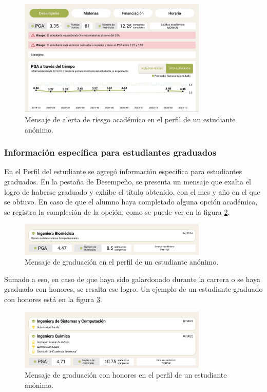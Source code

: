 \begin{figure}[H]
	\centering
	\includegraphics[width=0.8\textwidth]{assets/nes/riesgo_academico.png}
	\caption{Mensaje de alerta de riesgo académico en el perfil de un estudiante anónimo.}
	\label{fig:riesgo_academico}
\end{figure}

\subsubsection{Información específica para estudiantes graduados}

En el Perfil del estudiante se agregó información específica para estudiantes graduados. En la pestaña de Desempeño, se presenta un mensaje que exalta el logro de haberse graduado y exhibe el título obtenido, con el mes y año en el que se obtuvo. En caso de que el alumno haya completado alguna opción académica, se registra la compleción de la opción, como se puede ver en la figura \ref{fig:graduado}.

\begin{figure}[H]
	\centering
	\includegraphics[width=0.8\textwidth]{assets/nes/graduado.png}
	\caption{Mensaje de graduación en el perfil de un estudiante anónimo.}
	\label{fig:graduado}
\end{figure}

Sumado a eso, en caso de que haya sido galardonado durante la carrera o se haya graduado con honores, se resalta ese logro. Un ejemplo de un estudiante graduado con honores está en la figura \ref{fig:graduado_honores}.

\begin{figure}[H]
	\centering
	\includegraphics[width=0.8\textwidth]{assets/nes/graduado_honores.png}
	\caption{Mensaje de graduación con honores en el perfil de un estudiante anónimo.}
	\label{fig:graduado_honores}
\end{figure}
